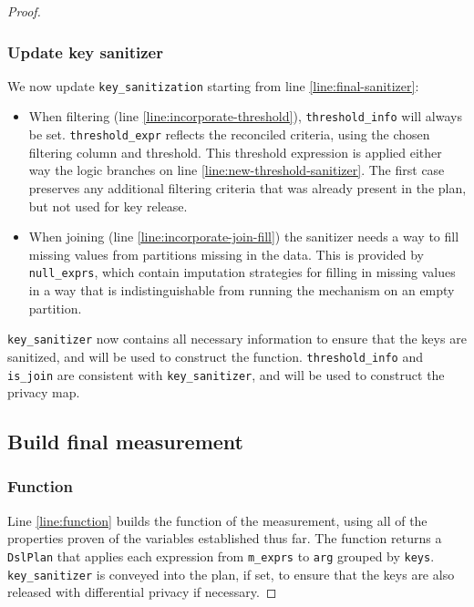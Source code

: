 \documentclass{article}
\begin{document}
\begin{proof}
\subsubsection{Update key sanitizer}
We now update \texttt{key\_sanitization} starting from line \ref{line:final-sanitizer}:
\begin{itemize}
    \item When filtering (line \ref{line:incorporate-threshold}), \texttt{threshold\_info} will always be set.
    \texttt{threshold\_expr} reflects the reconciled criteria, using the chosen filtering column and threshold.
    This threshold expression is applied either way the logic branches on line \ref{line:new-threshold-sanitizer}.
    The first case preserves any additional filtering criteria that was already present in the plan, but not used for key release.
    \item When joining (line \ref{line:incorporate-join-fill}) the sanitizer needs a way to fill missing values from partitions missing in the data.
    This is provided by \texttt{null\_exprs}, which contain imputation strategies for filling in missing values
    in a way that is indistinguishable from running the mechanism on an empty partition.
\end{itemize}

\texttt{key\_sanitizer} now contains all necessary information to ensure that the keys are sanitized,
and will be used to construct the function.
\texttt{threshold\_info} and \texttt{is\_join} are consistent with \texttt{key\_sanitizer},
and will be used to construct the privacy map.

\subsection{Build final measurement}
\subsubsection{Function}
Line \ref{line:function} builds the function of the measurement,
using all of the properties proven of the variables established thus far.
The function returns a \texttt{DslPlan} that applies each expression from \texttt{m\_exprs}
to \texttt{arg} grouped by \texttt{keys}.
\texttt{key\_sanitizer} is conveyed into the plan, if set,
to ensure that the keys are also released with differential privacy if necessary.


\end{proof}
\end{document}
